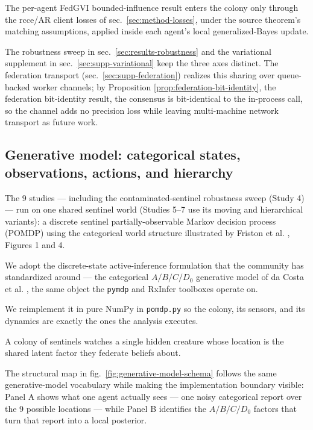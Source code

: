\documentclass[
  english,
]{article}
\theoremstyle{plain}
\theoremstyle{definition}
\theoremstyle{remark}
\theoremstyle{definition}
\begin{document}
The per-agent FedGVI bounded-influence result enters the colony only
through the rcce/AR client losses of sec.~\ref{sec:method-losses}, under
the source theorem's matching assumptions, applied inside each agent's
local generalized-Bayes update.

The robustness sweep in sec.~\ref{sec:results-robustness} and the
variational supplement in sec.~\ref{sec:supp-variational} keep the three
axes distinct. The federation transport (sec.~\ref{sec:supp-federation})
realizes this sharing over queue-backed worker channels; by Proposition
\ref{prop:federation-bit-identity}, the federation bit-identity result,
the consensus is bit-identical to the in-process call, so the channel
adds no precision loss while leaving multi-machine network transport as
future work.

\subsection{Generative model: categorical states, observations, actions,
and hierarchy}\label{sec:methods-generative-model}

The 9 studies --- including the contaminated-sentinel robustness sweep
(Study 4) --- run on one shared sentinel world (Studies 5--7 use its
moving and hierarchical variants): a discrete sentinel
partially-observable Markov decision process (POMDP) using the
categorical world structure illustrated by Friston et al.
\citeyearpar{friston2024federated}, Figures 1 and 4.

We adopt the discrete-state active-inference formulation that the
community has standardized around --- the categorical \(A/B/C/D_0\)
generative model of da Costa et al. \citeyearpar{dacosta2020active}, the
same object the \texttt{pymdp} \citep{heins2022pymdp} and RxInfer
\citep{bagaev2023rxinfer} toolboxes operate on.

We reimplement it in pure NumPy in \texttt{pomdp.py} so the colony, its
sensors, and its dynamics are exactly the ones the analysis executes.

A colony of sentinels watches a single hidden creature whose location is
the shared latent factor they federate beliefs about.

The structural map in fig.~\ref{fig:generative-model-schema} follows the
same generative-model vocabulary while making the implementation
boundary visible: Panel A shows what one agent actually sees --- one
noisy categorical report over the 9 possible locations --- while Panel B
identifies the \(A/B/C/D_0\) factors that turn that report into a local
posterior.
\end{document}
